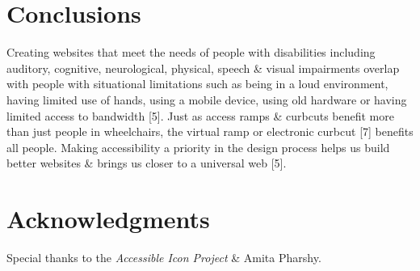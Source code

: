 \documentclass{acm_proc_article-sp}
\begin{document}
\section{Conclusions}
Creating websites that meet the needs of people with disabilities including auditory, cognitive, neurological, physical, speech \& visual impairments overlap with people with situational limitations such as being in a loud environment, having limited use of hands, using a mobile device, using old hardware or having limited access to bandwidth [5]. Just as access ramps \& curbcuts benefit more than just people in wheelchairs, the virtual ramp or electronic curbcut [7] benefits all people. Making accessibility a priority in the design process helps us build better websites \& brings us closer to a universal web [5].

\section{Acknowledgments}
Special thanks to the {\it Accessible Icon Project} \& Amita Pharshy.

\end{document}
